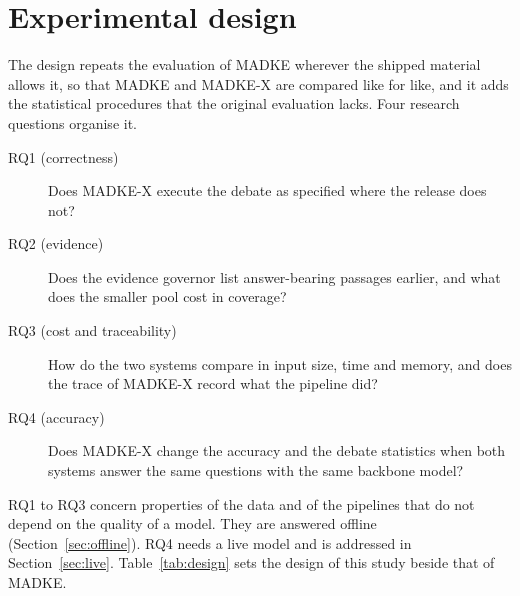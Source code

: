 \section{Experimental design}
\label{sec:design}

The design repeats the evaluation of MADKE wherever the shipped material allows it, so that MADKE and MADKE-X are compared like for like, and it adds the statistical procedures that the original evaluation lacks. Four research questions organise it.

\begin{description}
\item[RQ1 (correctness)] Does MADKE-X execute the debate as specified where the release does not?
\item[RQ2 (evidence)] Does the evidence governor list answer-bearing passages earlier, and what does the smaller pool cost in coverage?
\item[RQ3 (cost and traceability)] How do the two systems compare in input size, time and memory, and does the trace of MADKE-X record what the pipeline did?
\item[RQ4 (accuracy)] Does MADKE-X change the accuracy and the debate statistics when both systems answer the same questions with the same backbone model?
\end{description}

RQ1 to RQ3 concern properties of the data and of the pipelines that do not depend on the quality of a model. They are answered offline (Section~\ref{sec:offline}). RQ4 needs a live model and is addressed in Section~\ref{sec:live}. Table~\ref{tab:design} sets the design of this study beside that of MADKE.

